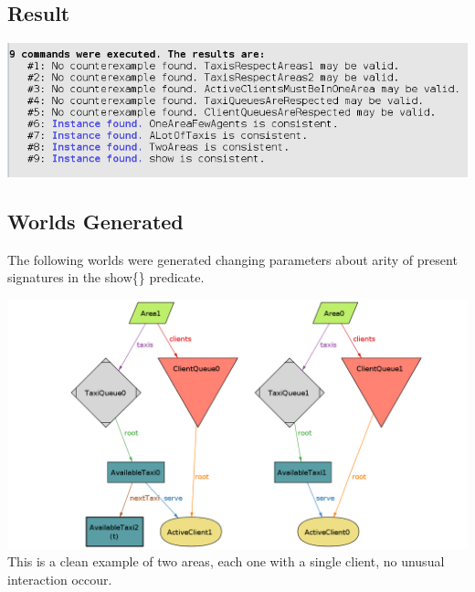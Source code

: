 \documentclass{article}
\begin{document}
\subsection{Result}
\begin{center}
	\includegraphics[width=.9\textwidth,height=.9\textheight,keepaspectratio]{AlloyChecks}
\end{center}
\subsection{Worlds Generated}
The following worlds were generated changing parameters about arity of present signatures in the show\{\} predicate.\\
\begin{center}
	\includegraphics[width=.9\textwidth,height=.9\textheight,keepaspectratio]{2Areas}
	\\This is a clean example of two areas, each one with a single client, no unusual interaction occour.\\
\end{center}
\end{document}

